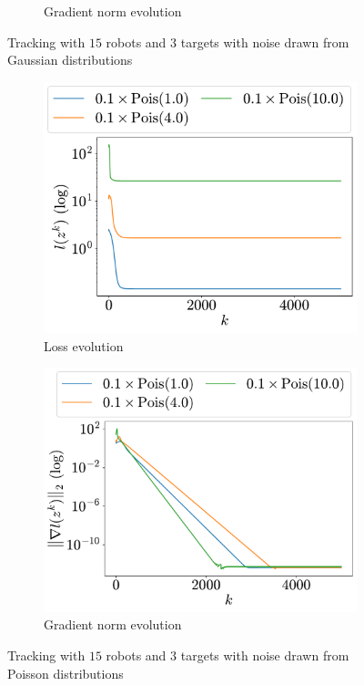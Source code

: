 \documentclass[a4paper,11pt,oneside]{book}
\begin{document}
\begin{figure}[H]
\begin{subfigure}[t]{0.48\linewidth}
            \caption{Gradient norm evolution}
      \end{subfigure}
      \caption{Tracking with $15$ robots and $3$ targets with noise drawn from Gaussian distributions}
      \label{fig:tracking_gaussian_15_3}
\end{figure}

\begin{figure}[H]
      \centering
      \begin{subfigure}[t]{0.48\linewidth}
            \centering
            \includegraphics[width=\linewidth]{./figs/tracking/poisson/loss.pdf} 
            \caption{Loss evolution}
      \end{subfigure}
      \hfill
      \begin{subfigure}[t]{0.48\linewidth}
            \centering
            \includegraphics[width=\linewidth]{./figs/tracking/poisson/gradient.pdf} 
            \caption{Gradient norm evolution}
      \end{subfigure}
      \caption{Tracking with $15$ robots and $3$ targets with noise drawn from Poisson distributions}
      \label{fig:tracking_poisson_15_3}
\end{figure}
\end{document}
